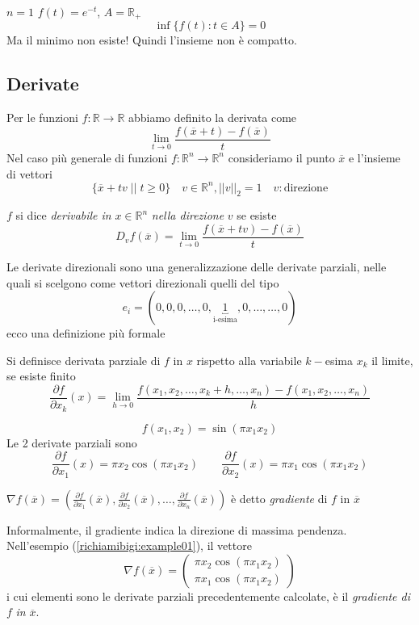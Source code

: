 \begin{example}
 $n = 1$  $f(t) = e^{-t}$, $A = \mathbb{R}_{+}$
 $$\inf \{ f(t): t \in A \} = 0$$ 
Ma il minimo non esiste! Quindi l'insieme non è compatto.
\end{example}

\subsection{Derivate}
Per le funzioni $f:\mathbb{R} \rightarrow \mathbb{R}$ abbiamo definito
la derivata come
$$ \lim_{t \to 0 } \frac{f(\overline{x} + t) - f(\overline{x})}{t}$$
Nel caso pi\`u generale di funzioni $f:\mathbb{R}^n \rightarrow \mathbb{R}^n$
consideriamo il punto $\overline{x}$ e l'insieme di vettori 
$$ \{ \overline{x} + tv \; | | \; t \geq 0  \} \quad  v \in \mathbb{R}^n, || v||_{2} = 1 \quad v:\text{direzione} $$

\begin{defn}
$f$ si dice \emph{derivabile in} $x \in \mathbb{R}^{n}$ 
\emph{nella direzione} $v$ se esiste
$$D_v f(\overline{x}) = \lim_{t \to 0 } \frac{f(\overline{x} + tv) - f(\overline{x})}{t}$$
\end{defn}

Le derivate direzionali sono una generalizzazione delle derivate
parziali, nelle quali si scelgono come vettori direzionali quelli
del tipo
$$ e_i = (0,0,0,\ldots, 0,\underbracket{1}_{\text{i-esima}},0, \ldots, \ldots, 0) $$
ecco una definizione più formale
\begin{defn}
Si definisce derivata parziale di $f$ in $x$ rispetto alla variabile
$k-$esima $x_k$ il limite, se esiste finito
$$\frac{\partial f}{\partial x_k} (x)=\lim_{h\to 0}\frac{f(x_1,x_2,\ldots,x_k+h,\ldots,x_n)-f(x_1,x_2,\ldots,x_n)}{h}$$
\end{defn}

\begin{example}
\label{richiamibigi:example01}
$$f(x_1,x_2) = \sin(\pi x_1 x_2)  $$
Le 2 derivate parziali sono
$$
\frac{\partial f}{\partial x_1}(x) = \pi x_2 \cos(\pi x_1 x_2)
\qquad
\frac{\partial f}{\partial x_2}(x) = \pi x_1 \cos(\pi x_1 x_2)
$$
\end{example}

\begin{defn}[Gradiente]
$\nabla f(\overline{x}) = 
(\frac{\partial f}{\partial x_1}(\overline{x}),
\frac{\partial f}{\partial x_2}(\overline{x}),
\ldots,
\frac{\partial f}{\partial x_n}(\overline{x}))$
\`e detto \emph{gradiente} di $f$ in $\overline{x}$
\end{defn}
Informalmente, il gradiente indica la direzione di massima pendenza.\\
Nell'esempio (\ref{richiamibigi:example01}),  il vettore
$$ \nabla f(\overline{x}) = 
\begin{pmatrix}
  \pi x_2 \cos(\pi x_1 x_2) \\
\pi x_1 \cos(\pi x_1 x_2)
\end{pmatrix}
$$
i cui elementi sono le derivate parziali precedentemente calcolate,
è il \emph{gradiente di} $f$ \emph{in} $\overline{x}$.\\

